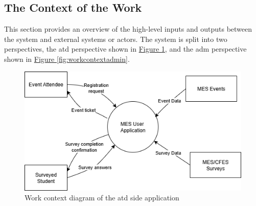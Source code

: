 \documentclass[12pt]{article}
\begin{document}
%


\subsection{The Context of the Work}

This section provides an overview of the high-level inputs and outputs between the system and external systems or
actors.
The system is split into two perspectives, the \gls{atd} perspective shown in \hyperref[fig:workcontextuser]{Figure
\ref{fig:workcontextuser}}, and the \gls{adm} perspective shown in \hyperref[fig:workcontextadmin]{Figure
\ref{fig:workcontextadmin}}.

\begin{center}
\begin{figure}[H]
    \centering
    \includegraphics[width=1\linewidth]{images/work_context_user.png}
    \caption{Work context diagram of the \gls{atd} side application}\label{fig:workcontextuser}
\end{figure}
\end{center}
\end{document}
